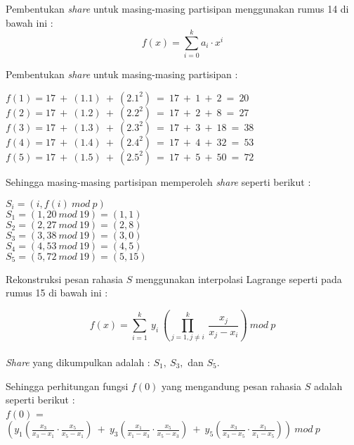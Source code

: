 \documentclass[a4paper,twoside]{article}
\begin{document}
\begin{enumerate}
\begin{itemize}
Pembentukan \textit{share} untuk masing-masing partisipan menggunakan rumus 14 di bawah ini :
\begin{equation}
f(x) = \sum_{i=0}^{k} a_{i} \cdot x^{i}
\end{equation} 

Pembentukan \textit{share} untuk masing-masing partisipan : 
\begin{center}
$f(1) = 17 \ + \ (1.1) \ + \ (2.1^{2}) \  = \ 17 \ + \ 1 \ + \ 2 \ = \ 20 $ \\
$f(2) = 17 \ + \ (1.2) \ + \ (2.2^{2}) \  = \ 17 \ + \ 2 \ + \ 8 \ = \ 27 $ \\
$f(3) = 17 \ + \ (1.3) \ + \ (2.3^{2}) \  = \ 17 \ + \ 3 \ + \ 18 \ = \ 38 $ \\
$f(4) = 17 \ + \ (1.4) \ + \ (2.4^{2}) \  = \ 17 \ + \ 4 \ + \ 32 \ = \ 53 $ \\
$f(5) = 17 \ + \ (1.5) \ + \ (2.5^{2}) \  = \ 17 \ + \ 5 \ + \ 50 \ = \ 72 $ \\
\end{center}

Sehingga masing-masing partisipan memperoleh \textit{share}  seperti berikut :
\begin{center}
$S_{i} = (i,f(i) \ mod \ p)$ \\
$S_{1} = (1, 20 \ mod \ 19) = (1,1)$ \\
$S_{2} = (2, 27 \ mod \ 19) = (2,8)$ \\
$S_{3} = (3, 38 \ mod \ 19) = (3,0)$ \\
$S_{4} = (4, 53 \ mod \ 19) = (4,5)$ \\
$S_{5} = (5, 72 \ mod \ 19) = (5,15)$ \\
\end{center}

Rekonstruksi pesan rahasia $S$ menggunakan interpolasi Lagrange seperti pada rumus 15 di bawah ini :

\begin{equation}
f(x) = \sum_{i=1}^{k} \ y_{i} \ \left( \prod_{j=1,j \neq i}^k \ \frac{x_{j}}{x_{j}-x_{i}} \right) \ mod \ p
\end{equation} \\

\textit{Share} yang dikumpulkan adalah : $S_{1}, \ S_{3},$ dan $S_{5}$. 

Sehingga perhitungan fungsi $f(0)$ yang mengandung pesan rahasia $S$ adalah seperti berikut : \\

$f(0)$ = $\left( y_{1} \left( \frac{x_{3}}{x_{3}-x_{1}} \cdot \frac{x_{5}}{x_{5}-x_{1}} \right) \ + \ y_{3} \left( \frac{x_{1}}{x_{1}-x_{3}} \cdot \frac{x_{5}}{x_{5}-x_{3}}\right) \ + \ y_{5} \left( \frac{x_{3}}{x_{3}-x_{5}} \cdot \frac{x_{1}}{x_{1}-x_{5}}\right) \right) \ mod \ p$


\end{itemize}
\end{enumerate}
\end{document}
